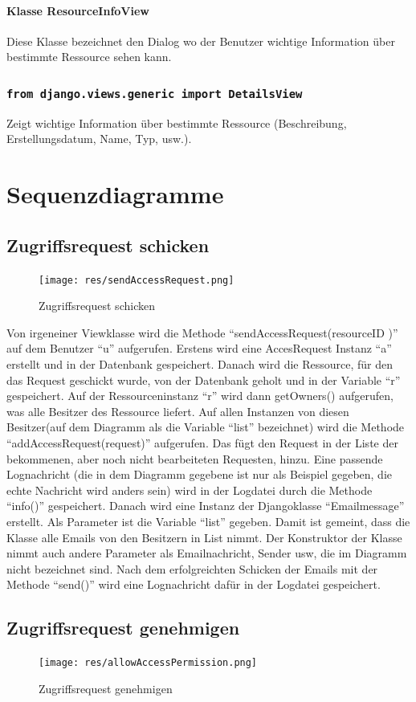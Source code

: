 \documentclass[parskip=full,11pt]{scrartcl}
\newcommand{\class}[1]{\subsubsection*{\lstinline[basicstyle=\ttfamily\large]{#1}}}
\begin{document}
\paragraph*{Klasse ResourceInfoView}
Diese Klasse bezeichnet den Dialog wo der Benutzer wichtige Information über bestimmte Ressource sehen kann.
\class{from django.views.generic import DetailsView}
Zeigt wichtige Information über bestimmte Ressource (Beschreibung, Erstellungsdatum, Name, Typ, usw.).
\newpage
 \section{Sequenzdiagramme}
 \subsection{Zugriffsrequest schicken}
 \begin{figure}[ht!]
 	\centering
 	\texttt{[image: res/sendAccessRequest.png]}
 	\caption{Zugriffsrequest schicken}
 	\label{fig:sendAccReq}
 \end{figure}
 
Von irgeneiner Viewklasse wird die Methode \enquote{sendAccessRequest(resourceID )} auf dem Benutzer \enquote{u}  aufgerufen. Erstens wird eine AccesRequest Instanz \enquote{a} erstellt und in der Datenbank gespeichert. Danach wird die Ressource, für den das Request geschickt wurde, von der Datenbank geholt und in der Variable \enquote{r} gespeichert. Auf der Ressourceninstanz \enquote{r} wird dann getOwners() aufgerufen, was alle Besitzer des Ressource liefert. Auf allen Instanzen von diesen Besitzer(auf dem Diagramm als die Variable \enquote{list} bezeichnet) wird die Methode  \enquote{addAccessRequest(request)} aufgerufen. Das fügt den Request in der Liste der bekommenen, aber noch nicht bearbeiteten Requesten, hinzu. Eine passende Lognachricht (die in dem Diagramm gegebene ist nur als Beispiel gegeben, die echte Nachricht wird anders sein) wird in der Logdatei durch die Methode \enquote{info()} gespeichert. Danach wird eine Instanz der Djangoklasse \enquote{Emailmessage} erstellt. Als Parameter ist die Variable \enquote{list} gegeben. Damit ist gemeint, dass die Klasse alle Emails von den Besitzern in List nimmt. Der Konstruktor der Klasse nimmt auch andere Parameter als Emailnachricht, Sender usw, die im Diagramm nicht bezeichnet sind. Nach dem erfolgreichten Schicken der Emails mit der Methode  \enquote{send()} wird eine Lognachricht dafür in der Logdatei gespeichert. 
 
  \newpage
 \subsection{Zugriffsrequest genehmigen}
 \begin{figure}[ht!]
 	\centering
 	\texttt{[image: res/allowAccessPermission.png]}
 	\caption{Zugriffsrequest genehmigen}
 	 	\label{fig:allowAccPerm}
 \end{figure}
 
\end{document}
